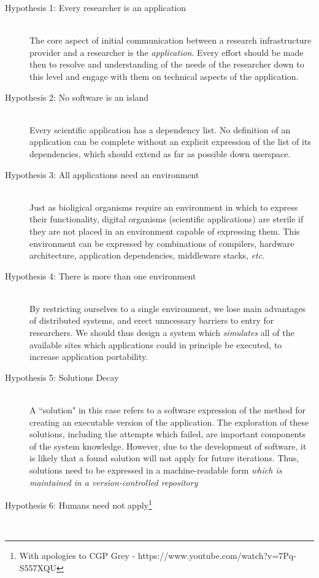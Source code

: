 \documentclass[a4paper]{jpconf}
\begin{document}
\begin{description}
  \item[Hypothesis 1: Every researcher is an application] \hfill \\
    The core aspect of initial communication between a research infrastructure provider and a researcher is the {\it application}. Every effort should be made then to resolve and understanding of the needs of the researcher down to this level and engage with them on technical aspects of the application.
  \item[Hypothesis 2: No software is an island] \hfill \\
    Every scientific application has a dependency list. No definition of an application can be complete without an explicit expression of the list of its dependencies, which should extend as far as possible down userspace.
  \item[Hypothesis 3: All applications need an environment] \hfill \\
    Just as bioligical organisms require an environment in which to express their functionality, digital organisms (scientific applications) are sterile if they are not placed in an environment capable of expressing them. This environment can be expressed by combinations of compilers, hardware architecture, application dependencies, middleware stacks, {\it etc}.
  \item[Hypothesis 4: There is more than one environment] \hfill \\
    By restricting ourselves to a single environment, we lose main advantages of distributed systems, and erect unncessary barriers to entry for researchers. We should thus design a system which {\it simulates} all of the available sites which applications could in principle be executed, to increase application portability.
  \item[Hypothesis 5: Solutions Decay] \hfill \\
    A ``solution" in this case refers to a software expression of the method for creating an executable version of the application. The exploration of these solutions, including the attempts which failed, are important components of the system knowledge. However, due to the development of software, it is likely that a found solution will not apply for future iterations. Thus, solutions need to be expressed in a machine-readable form {\it which is maintained in a version-controlled repository}
  \item[Hypothesis 6: Humans need not apply\footnote{With apologies to CGP Grey - https://www.youtube.com/watch?v=7Pq-S557XQU}] \hfill \\

\end{description}
\end{document}
